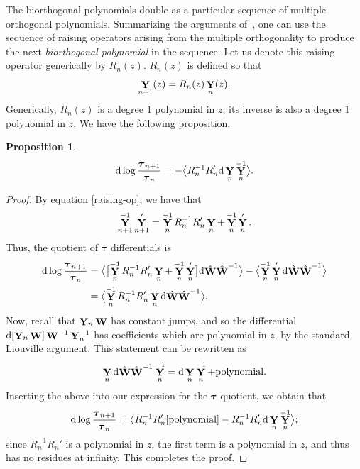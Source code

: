 \documentclass[pdftex]{sigma}
\DeclareMathOperator{\YY}{{\bf Y}}
\DeclareMathOperator{\WW}{{\bf W}}
\numberwithin{equation}{section}
\newtheorem{Proposition}[Theorem]{Proposition}
 { \theoremstyle{definition}
\newtheorem{Definition}[Theorem]{Definition}
\newtheorem{Note}[Theorem]{Note}
\newtheorem{Example}[Theorem]{Example}
\newtheorem{Remark}[Theorem]{Remark} }
\begin{document}
The biorthogonal polynomials double as a particular sequence of multiple orthogonal polynomials. Summarizing the arguments of~\cite{Bertola-Marchal}, one can use the sequence of raising operators arising from the multiple orthogonality to produce the next \textit{biorthogonal polynomial} in the sequence. Let us
denote this raising operator generically by $R_n(z)$. $R_n(z)$ is defined so that
 \begin{equation}\label{raising-op}
 \YY_{n+1}(z) = R_{n}(z) \YY_n(z).
 \end{equation}
Generically, $R_n(z)$ is a degree $1$ polynomial in $z$; its inverse is also a degree $1$ polynomial in $z$. We have the following proposition.
\begin{Proposition}
 \begin{equation*}
 {\rm d}\log\frac{\boldsymbol{\tau}_{n+1}}{\boldsymbol{\tau}_{n}} = -\bigl\langle R_n^{-1} R_n' {\rm d}\YY_n \YY^{-1}_n\bigr\rangle.
 \end{equation*}
\end{Proposition}
 \begin{proof}
 By equation \eqref{raising-op}, we have that
 \begin{equation*}
 \YY_{n+1}^{-1} \YY_{n+1}' = \YY_n^{-1} R_n^{-1} R_n'\YY_n + \YY_n^{-1}\YY_n'.
 \end{equation*}
 Thus, the quotient of $\boldsymbol{\tau}$ differentials is
 \begin{align*}
 \begin{split}
 {\rm d}\log\frac{\boldsymbol{\tau}_{n+1}}{\boldsymbol{\tau}_{n}} &= \bigl\langle \bigl[\YY_n^{-1} R_n^{-1} R_n'\YY_n + \YY_n^{-1}\YY_n'\bigr] {\rm d}\hat{\WW}\hat{\WW}^{-1}\bigr\rangle - \bigl\langle \YY_n^{-1}\YY_n' {\rm d}\hat{\WW} \hat{\WW}^{-1} \bigr\rangle\\
 &=\bigl\langle\YY_n^{-1} R_n^{-1} R_n'\YY_n {\rm d}\hat{\WW}\hat{\WW}^{-1}\bigr\rangle.
 \end{split}
 \end{align*}
 Now, recall that $\YY_n \WW$ has constant jumps, and so the differential ${\rm d}[\YY_n \WW]\WW^{-1} \YY_n^{-1}$ has coefficients which
 are polynomial in $z$, by the standard Liouville argument. This statement can be rewritten as
 \begin{equation*}
 \YY_n {\rm d}\hat{\WW}\hat{\WW}^{-1} \YY_n^{-1} = {\rm d}\YY_n \YY_n^{-1} + \text{polynomial}.
 \end{equation*}
 Inserting the above into our expression for the $\boldsymbol{\tau}$-quotient, we obtain that
 \begin{equation*}
 {\rm d}\log\frac{\boldsymbol{\tau}_{n+1}}{\boldsymbol{\tau}_{n}} = \bigl\langle R_n^{-1}R_n'[\text{polynomial}] - R_n^{-1}R_n' {\rm d}\YY_n\YY_n^{-1}\bigr\rangle;
 \end{equation*}
 since $R_n^{-1}R_n'$ is a polynomial in $z$, the first term is a polynomial in $z$, and thus has no residues at infinity. This completes the proof.
 \end{proof}
\end{document}
